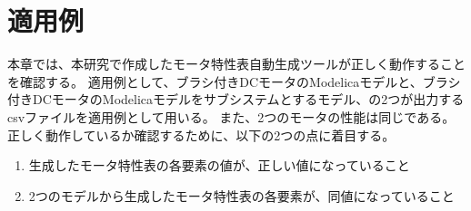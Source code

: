 \chapter{適用例}\label{cha:Indication}
本章では、本研究で作成したモータ特性表自動生成ツールが正しく動作することを確認する。
適用例として、ブラシ付きDCモータのModelicaモデルと、ブラシ付きDCモータのModelicaモデルをサブシステムとするモデル、の2つが出力するcsvファイルを適用例として用いる。
また、2つのモータの性能は同じである。
正しく動作しているか確認するために、以下の2つの点に着目する。


\begin{enumerate}
    \item 生成したモータ特性表の各要素の値が、正しい値になっていること
    \item 2つのモデルから生成したモータ特性表の各要素が、同値になっていること
\end{enumerate}


